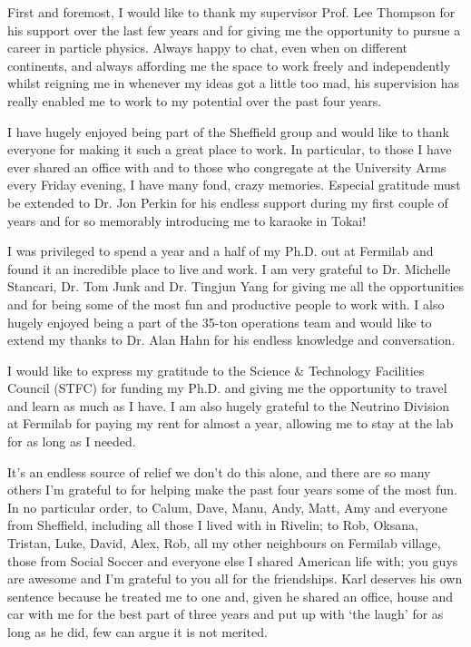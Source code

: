 
\begin{acknowledgements}

  First and foremost, I would like to thank my supervisor Prof. Lee Thompson for his support over the last few years and for giving me the opportunity to pursue a career in particle physics.  Always happy to chat, even when on different continents, and always affording me the space to work freely and independently whilst reigning me in whenever my ideas got a little too mad, his supervision has really enabled me to work to my potential over the past four years.

  I have hugely enjoyed being part of the Sheffield group and would like to thank everyone for making it such a great place to work.  In particular, to those I have ever shared an office with and to those who congregate at the University Arms every Friday evening, I have many fond, crazy memories.  Especial gratitude must be extended to Dr. Jon Perkin for his endless support during my first couple of years and for so memorably introducing me to karaoke in Tokai!

  I was privileged to spend a year and a half of my Ph.D. out at Fermilab and found it an incredible place to live and work.  I am very grateful to Dr. Michelle Stancari, Dr. Tom Junk and Dr. Tingjun Yang for giving me all the opportunities and for being some of the most fun and productive people to work with.  I also hugely enjoyed being a part of the 35-ton operations team and would like to extend my thanks to Dr. Alan Hahn for his endless knowledge and conversation.

  I would like to express my gratitude to the Science \& Technology Facilities Council (STFC) for funding my Ph.D. and giving me the opportunity to travel and learn as much as I have.  I am also hugely grateful to the Neutrino Division at Fermilab for paying my rent for almost a year, allowing me to stay at the lab for as long as I needed.

  It's an endless source of relief we don't do this alone, and there are so many others I'm grateful to for helping make the past four years some of the most fun.  In no particular order, to Calum, Dave, Manu, Andy, Matt, Amy and everyone from Sheffield, including all those I lived with in Rivelin; to Rob, Oksana, Tristan, Luke, David, Alex, Rob, all my other neighbours on Fermilab village, those from Social Soccer and everyone else I shared American life with; you guys are awesome and I'm grateful to you all for the friendships.  Karl deserves his own sentence because he treated me to one and, given he shared an office, house and car with me for the best part of three years and put up with `the laugh' for as long as he did, few can argue it is not merited.


\end{acknowledgements}

